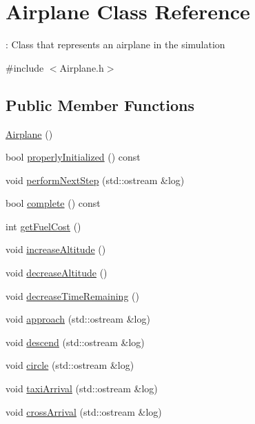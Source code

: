 \hypertarget{classAirplane}{}\section{Airplane Class Reference}
\label{classAirplane}


\+: Class that represents an airplane in the simulation  




{\ttfamily \#include $<$Airplane.\+h$>$}

\subsection*{Public Member Functions}
\begin{DoxyCompactItemize}
\item 
\hyperlink{classAirplane_afccae36e3013e038d51504cea1a98219}{Airplane} ()
\item 
bool \hyperlink{classAirplane_aa58418c017671c7b5de17c81a4172971}{properly\+Initialized} () const 
\item 
void \hyperlink{classAirplane_ad705fa6ec334df7a62c2911e0981e95f}{perform\+Next\+Step} (std\+::ostream \&log)
\item 
bool \hyperlink{classAirplane_a44a6eac9309f6218c7e0c0332f25ee51}{complete} () const 
\item 
int \hyperlink{classAirplane_a3948e4de793ba5d20d17d16d6eaf88f8}{get\+Fuel\+Cost} ()
\item 
void \hyperlink{classAirplane_a53f024bb7bd5d429e30d54a87bb0ec0b}{increase\+Altitude} ()
\item 
void \hyperlink{classAirplane_a94b54e287a5bd8ca9b5959f9e74bbf19}{decrease\+Altitude} ()
\item 
void \hyperlink{classAirplane_ac97a6ca10328e33558f682e0b45e5a60}{decrease\+Time\+Remaining} ()
\item 
void \hyperlink{classAirplane_abd790d1e894b85c33f698a920b5c2fe2}{approach} (std\+::ostream \&log)
\item 
void \hyperlink{classAirplane_ae250403048844ff6cd5a1de3be2fdf56}{descend} (std\+::ostream \&log)
\item 
void \hyperlink{classAirplane_afab6247e7e75ecf584dadbe19e581d23}{circle} (std\+::ostream \&log)
\item 
void \hyperlink{classAirplane_a8e23b42b6c256110579e8d64c32fd196}{taxi\+Arrival} (std\+::ostream \&log)
\item 
void \hyperlink{classAirplane_ab389f4b94829a8b87b42fb30625a21af}{cross\+Arrival} (std\+::ostream \&log)

\end{DoxyCompactItemize}
